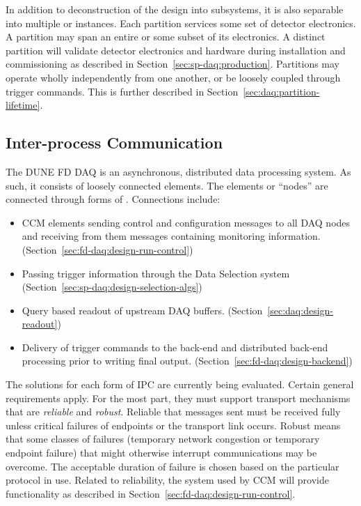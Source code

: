 In addition to deconstruction of the  design into subsystems, it is also separable into multiple  or instances. 
Each partition 
 services some set of detector electronics. 
A partition may span an entire %
  or some subset of its electronics. 
A distinct partition will %
validate detector electronics and hardware during installation and commissioning as described in Section~\ref{sec:sp-daq:production}.
Partitions may operate wholly independently from one another, or be loosely coupled through trigger commands.  
This is further described in Section~\ref{sec:daq:partition-lifetime}.



\subsection{Inter-process Communication}
\label{sec:daq:design-ipc}

The DUNE FD DAQ is an asynchronous, distributed data processing system. 
As such, it consists of loosely connected elements.
The elements or ``nodes'' are connected through forms of .
Connections include:

\begin{itemize}
\item CCM elements sending control and configuration messages to all DAQ nodes and receiving from them messages containing monitoring information.  (Section~\ref{sec:fd-daq:design-run-control})
\item Passing trigger information through the Data Selection system (Section~\ref{sec:sp-daq:design-selection-algs})
\item Query based readout of upstream DAQ buffers. (Section~\ref{sec:daq:design-readout})
\item Delivery of trigger commands to the back-end and distributed back-end processing prior to writing final output. (Section~\ref{sec:fd-daq:design-backend})
\end{itemize}

The solutions for each form of IPC are currently being evaluated. 
Certain general requirements apply.
For the most part, they must support transport mechanisms that are \textit{reliable} and \textit{robust}. 
Reliable that messages sent must be received fully unless critical failures of endpoints or the transport link occurs.  Robust means that some classes of failures (temporary network congestion or temporary endpoint failure) that might otherwise interrupt communications may be overcome.
The acceptable duration of failure is chosen based on the particular protocol in use.
Related to reliability, the   system used by CCM will provide  functionality as described in Section~\ref{sec:fd-daq:design-run-control}.

